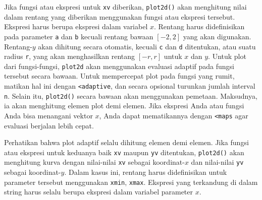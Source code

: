 \documentclass[a4paper,11pt,oneside]{scrbook}
\newenvironment{eulernotebook}{}{}
\newenvironment{eulercomment}{\par\medskip\noindent}{\par\medskip}
\begin{document}
\begin{eulernotebook}
\begin{eulercomment}
Jika fungsi atau ekspresi untuk \texttt{xv} diberikan, \texttt{plot2d()} akan menghitung nilai dalam rentang yang diberikan menggunakan fungsi atau ekspresi tersebut. Ekspresi harus berupa ekspresi dalam variabel $x$. Rentang harus didefinisikan pada parameter \texttt{a} dan \texttt{b} kecuali rentang bawaan $[-2,2]$ yang akan digunakan. Rentang-$y$ akan dihitung secara otomatis, kecuali \texttt{c} dan \texttt{d} ditentukan, atau suatu radius \texttt{r}, yang akan menghasilkan rentang $[-r,r]$ untuk $x$ dan $y$. Untuk plot dari fungsi-fungsi, \texttt{plot2d} akan menggunakan evaluasi adaptif pada fungsi tersebut secara bawaan. Untuk mempercepat plot pada fungsi yang rumit, matikan hal ini dengan \texttt{<adaptive}, dan secara opsional turunkan jumlah interval \texttt{n}. Selain itu, \texttt{plot2d()} secara bawaan akan menggunakan pemetaan. Maksudnya, ia akan menghitung elemen plot demi elemen. Jika ekspresi Anda atau fungsi Anda bisa menangani vektor $x$, Anda dapat mematikannya dengan \texttt{<maps} agar evaluasi berjalan lebih cepat.

Perhatikan bahwa plot adaptif selalu dihitung elemen demi elemen. Jika fungsi atau ekspresi untuk keduanya baik \texttt{xv} maupun \texttt{yv} ditentukan, \texttt{plot2d()} akan menghitung kurva dengan nilai-nilai \texttt{xv} sebagai koordinat-$x$ dan nilai-nilai \texttt{yv} sebagai koordinat-$y$. Dalam kasus ini, rentang harus didefinisikan untuk parameter tersebut menggunakan \texttt{xmin}, \texttt{xmax}. Ekspresi yang terkandung di dalam string harus selalu berupa ekspresi dalam variabel parameter $x$.
\end{eulercomment}

\end{eulernotebook}
\end{document}
